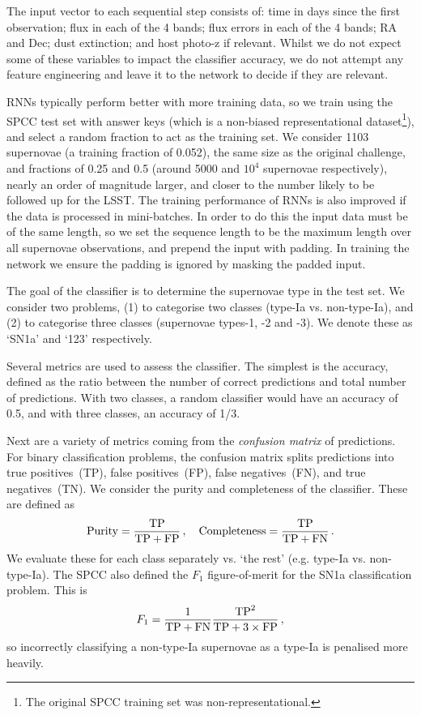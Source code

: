 \documentclass[twocolumn]{aastex61}
\begin{document}
The input vector to each sequential step consists of: time in days since the first observation; flux in each of the 4 bands; flux errors in each of the 4 bands; RA and Dec; dust extinction; and host photo-z if relevant. Whilst we do not expect some of these variables to impact the classifier accuracy, we do not attempt any feature engineering and leave it to the network to decide if they are relevant. 

RNNs typically perform better with more training data, so we train using the SPCC test set with answer keys (which is a non-biased representational dataset\footnote{The original SPCC training set was non-representational.}), and select a random fraction to act as the training set. We consider 1103 supernovae (a training fraction of 0.052), the same size as the original challenge, and fractions of 0.25 and 0.5 (around 5000 and $10^4$ supernovae respectively), nearly an order of magnitude larger, and closer to the number likely to be followed up for the LSST. The training performance of RNNs is also improved if the data is processed in mini-batches. In order to do this the input data must be of the same length, so we set the sequence length to be the maximum length over all supernovae observations, and prepend the input with padding. In training the network we ensure the padding is ignored by masking the padded input. 

The goal of the classifier is to determine the supernovae type in the test set. We consider two problems, (1) to categorise two classes (type-Ia vs. non-type-Ia), and (2) to categorise three classes (supernovae types-1, -2 and -3). We denote these as  `SN1a' and  `123' respectively.  

Several metrics are used to assess the classifier. The simplest is the accuracy, defined as the ratio between the number of correct predictions and total number of predictions. With two classes, a random classifier would have an accuracy of 0.5, and with three classes, an accuracy of 1/3.

Next are a variety of metrics coming from the {\em confusion matrix} of predictions.  For binary classification problems, the confusion matrix splits predictions into true positives~(TP), false positives~(FP), false negatives~(FN), and true negatives~(TN). We consider the purity and completeness of the classifier. These are defined as 
\begin{equation}
{\rm Purity} = \frac{{\rm TP}}{{\rm TP}+{\rm FP}}\,, \quad {\rm Completeness} = \frac{{\rm TP}}{{\rm TP}+{\rm FN}}\,.
\end{equation}
We evaluate these for each class separately vs. `the rest' (e.g. type-Ia vs. non-type-Ia). The SPCC also defined the $F_1$ figure-of-merit for the SN1a classification problem. This is 
\begin{equation}
F_1 = \frac{1}{{\rm TP}+{\rm FN}} \frac{{\rm TP}^2}{{\rm TP}+3 \times {\rm FP}}\,,
\end{equation}
so incorrectly classifying a non-type-Ia supernovae as a type-Ia is penalised more heavily.
\end{document}
